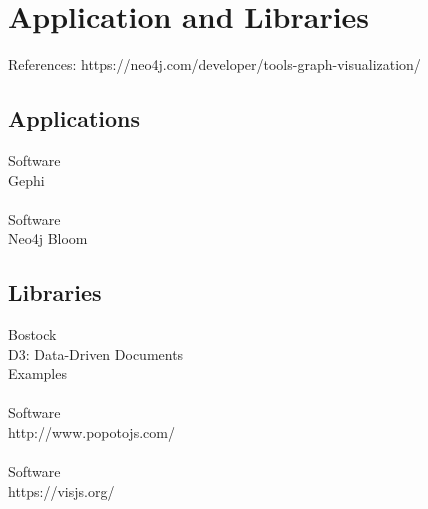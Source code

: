 \section{Application and Libraries}
References: https://neo4j.com/developer/tools-graph-visualization/

\subsection{Applications}
Software\\
Gephi\\
\\
Software\\
Neo4j Bloom\\
\subsection{Libraries}
Bostock\\
D3: Data-Driven Documents\\
Examples\\
\\
Software\\
http://www.popotojs.com/ \\
\\
Software\\
https://visjs.org/